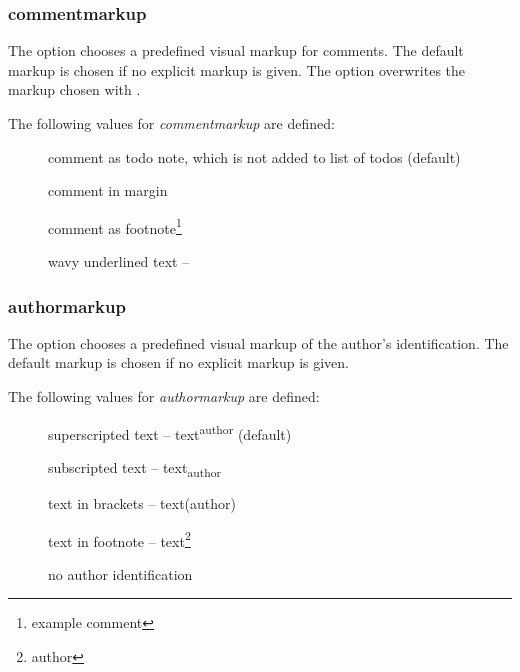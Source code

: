 


\subsubsection{commentmarkup}


The  option chooses a predefined visual markup for comments.
The default markup is chosen if no explicit markup is given.
The option  overwrites the markup chosen with .

The following values for \emph{commentmarkup} are defined:

\begin{description}
	\item [] comment as todo note, which is not added to list of todos (default)
	\item [] comment in margin
	\item [] comment as footnote\footnote{example comment}
	\item [] wavy underlined text -- 
\end{description}



\subsubsection{authormarkup}


The  option chooses a predefined visual markup of the author's identification.
The default markup is chosen if no explicit markup is given.

The following values for \emph{authormarkup} are defined:

\begin{description}
	\item [] superscripted text -- text\textsuperscript{author} (default)
	\item [] subscripted text -- text\textsubscript{author}
	\item [] text in brackets -- text(author)
	\item [] text in footnote -- text\footnote{author}
	\item [] no author identification
\end{description}

